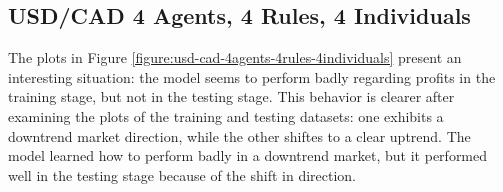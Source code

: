 \newpage

\subsection{USD/CAD 4 Agents, 4 Rules, 4 Individuals}
\label{results:forecast-usd-cad-4agents-4rules-4individuals}

The plots in Figure \ref{figure:usd-cad-4agents-4rules-4individuals} present an interesting situation: the model seems to perform badly regarding profits in the training stage, but not in the testing stage. This behavior is clearer after examining the plots of the training and testing datasets: one exhibits a downtrend market direction, while the other shiftes to a clear uptrend. The model learned how to perform badly in a downtrend market, but it performed well in the testing stage because of the shift in direction.

